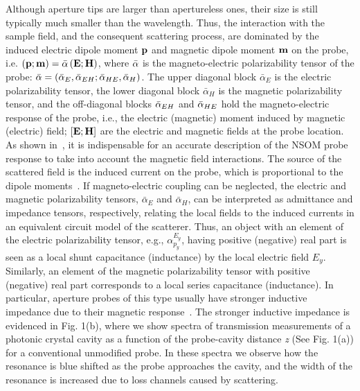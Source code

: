\documentclass{osa-article}
\begin{document}
	Although aperture tips are larger than apertureless ones, their size is still typically much smaller than the wavelength. Thus, the interaction with the sample field, and the consequent scattering process, are dominated by the induced electric dipole moment $\bf{p}$ and magnetic dipole moment $\bf{m}$ on the probe, i.e. $\left(\bf{p};\bf{m}\right)=\bar{\bf{\alpha}} \left(\bf{E};\bf{H}\right)$, where $\bar{\bf{\alpha}}$ is the magneto-electric polarizability tensor \cite{Sersic_2009,Bernal_2013} of the probe: $\bar{\bf{\alpha}}=\left(\bar{\bf{\alpha}}_{E},\bar{\bf{\alpha}}_{EH};\bar{\bf{\alpha}}_{HE},\bar{\bf{\alpha}}_{H}\right)$. The upper diagonal block $\bar {\alpha }_{E}$ is the electric polarizability tensor, the lower diagonal block $\bar {\alpha }_H$ is the magnetic polarizability tensor, and the off-diagonal blocks $\bar{\bf{\alpha}}_{EH}$ and $\bar{\bf{\alpha}}_{HE}$ hold the magneto-electric response of the probe, i.e., the electric (magnetic) moment induced by magnetic (electric) field; $\left[\bf{E};\bf{H}\right]$ are the electric and magnetic fields at the probe location. As shown in~\cite{Olmon_2010,Devaux_2000, Kihm_2011}, it is indispensable for an accurate description of the NSOM probe response to take into account the magnetic field interactions. The source of the scattered field is the induced current on the probe, which is proportional to the dipole moments~\cite{Ribaric_95}. If magneto-electric coupling can be neglected, the electric and magnetic polarizability tensors, $\bar {\alpha }_{E}$ and $\bar {\alpha }_{H}$, can be interpreted as admittance and impedance tensors, respectively, relating the local fields to the induced currents in an equivalent circuit model of the scatterer. Thus, an object with an element of the electric polarizability tensor, e.g., $\alpha^{E_{y}}_{p_{y}}$, having positive (negative) real part is seen as a local shunt capacitance (inductance) by the local electric field $E_{y}$. Similarly, an element of the magnetic polarizability tensor with positive (negative) real part corresponds to a local series capacitance (inductance). In particular, aperture probes of this type usually have stronger inductive impedance due to their magnetic response~\cite{Burresi_2010}. The stronger inductive impedance is evidenced in Fig. 1(b), where we show spectra of transmission measurements of a photonic crystal cavity as a function of the probe-cavity distance \textit{z} (See Fig. 1(a)) for a conventional unmodified probe. In these spectra we observe how the resonance is blue shifted as the probe approaches the cavity, and the width of the resonance is increased due to loss channels caused by scattering.\par
\end{document}
